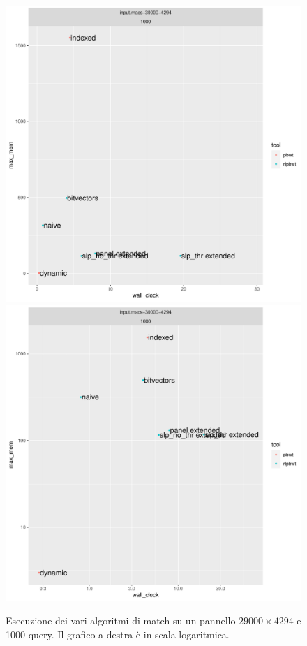\begin{figure}
  \centering
  \includegraphics[scale = 0.35]{img/time_vs_mem_1000.pdf}
  \includegraphics[scale = 0.35]{img/time_vs_mem-loglog_1000.pdf}
  \caption{Esecuzione dei vari algoritmi di match su un pannello
    $29000\times 4294$ e 1000 query.  Il grafico a destra è in scala
    logaritmica. }
  \label{fig:1000}
\end{figure}

